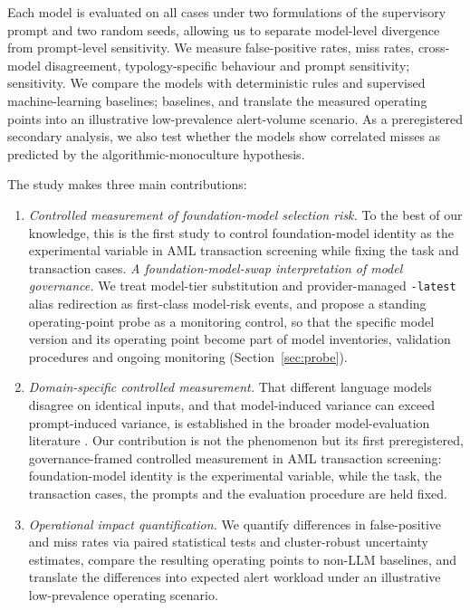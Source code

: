 \documentclass[pdflatex,sn-basic,Numbered]{sn-jnl}
\newcommand{\HLtext}[1]{\texthl{#1}}
\newcommand{\HLdel}[1]{\textcolor{HLink}{\sout{#1}}}
\renewcommand{\HLtext}[1]{#1}\renewcommand{\HLdel}[1]{#1}%
\begin{document}
Each model is evaluated on all cases under two formulations of the supervisory prompt and two random seeds, allowing us to separate model-level divergence from prompt-level sensitivity. We measure false-positive rates, miss rates, cross-model disagreement, typology-specific behaviour and prompt \HLdel{sensitivity;} \HLtext{sensitivity. We} compare the models with deterministic rules and supervised machine-learning \HLdel{baselines;} \HLtext{baselines,} and translate the measured operating points into an illustrative low-prevalence alert-volume scenario. As a preregistered secondary analysis, we also test whether the models show correlated misses as predicted by the algorithmic-monoculture hypothesis.

The study makes three main contributions:

\begin{enumerate}
\item \HLdel{\emph{Controlled measurement of foundation-model selection risk.} To the best of our knowledge, this is the first study to control foundation-model identity as the experimental variable in AML transaction screening while fixing the task and transaction cases.} \emph{A foundation-model-swap interpretation of model governance.} \HLtext{We treat model-tier substitution and provider-managed} \texttt{-latest} \HLtext{alias redirection as first-class model-risk events, and propose a standing operating-point probe as a monitoring control, so that the specific model version and its operating point become part of model inventories, validation procedures and ongoing monitoring} (Section~\ref{sec:probe}\HLtext{).}
\item \emph{Domain-specific controlled measurement.} \HLtext{That different language models disagree on identical inputs, and that model-induced variance can exceed prompt-induced variance, is established in the broader model-evaluation literature} \cite{helm,promptsens}\HLtext{. Our contribution is not the phenomenon but its first preregistered, governance-framed controlled measurement in AML transaction screening: foundation-model identity is the experimental variable, while the task, the transaction cases, the prompts and the evaluation procedure are held fixed.}
\item \emph{Operational impact quantification.} We quantify differences in false-positive and miss rates via paired statistical tests and \HLtext{cluster-robust} uncertainty estimates, compare the resulting operating points to non-LLM baselines, and translate the differences into expected alert workload under an illustrative low-prevalence operating scenario.
\end{enumerate}
\end{document}
